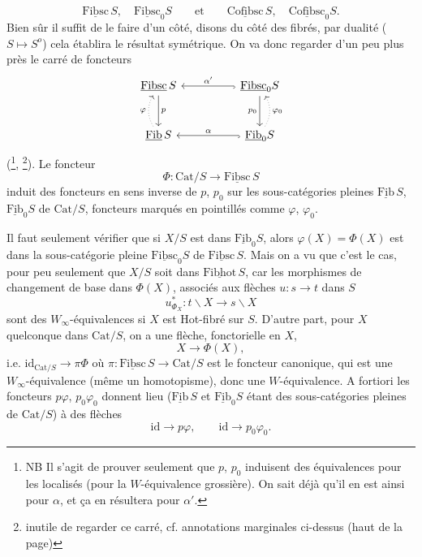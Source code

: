 \documentclass[11pt]{article}
\newcommand{\msp}[1]{\marginpar{\footnotesize [#1]}}
\newcommand{\uc}[1]{\underline{\mathrm{#1}}}
\newcommand{\Cat}{\mathrm{Cat}}
\begin{document}
\[
\uc{Fibsc}\,S,\quad \uc{Fibsc}_0S \qquad \text{et} \qquad \uc{Cofibsc}\,S,\quad \uc{Cofibsc}_0S.
\]
Bien sûr il suffit de le faire d'un côté, disons du côté des fibrés, par dualité ($S \longmapsto S^o$) cela établira le résultat symétrique. On va donc regarder d'un peu plus près le carré de foncteurs
\[
\begin{tikzcd}[column sep=huge, row sep=large]
\uc{Fibsc}\,S \arrow[d, "p"] & \uc{Fibsc}_0S \arrow[l, hook, "\alpha'"'] \arrow[d, "p_0"'] \\
\uc{Fib}\,S \arrow[u, dotted, bend left, "\varphi"] & \uc{Fib}_0S \arrow[l, hook, "\alpha"'] \arrow[u, dotted, bend right, "\varphi_0"']
\end{tikzcd}
\]
(\footnote[37]{NB Il s'agit de prouver seulement que $p$, $p_0$ induisent des équivalences pour les localisés (pour la $W$-équivalence grossière). On sait déjà qu'il en est ainsi pour $\alpha$, et ça en résultera pour $\alpha'$.}, \footnote[38]{inutile de regarder ce carré, cf. annotations marginales ci-dessus (haut de la page)}). Le foncteur
\[
\Phi : \Cat/S \longrightarrow \uc{Fibsc}\,S
\]
induit des foncteurs en sens inverse de $p$, $p_0$ sur les sous-catégories pleines $\uc{Fib}\,S$, $\uc{Fib}_0S$ de $\Cat/S$, foncteurs marqués en pointillés comme $\varphi$, $\varphi_0$.

\msp{page 54}

Il faut seulement vérifier que si $X/S$ est dans $\uc{Fib}_0S$, alors $\varphi(X) = \Phi(X)$ est dans la sous-catégorie pleine $\uc{Fibsc}_0S$ de $\uc{Fibsc}\,S$. Mais on a vu que c'est le cas, pour peu seulement que $X/S$ soit dans $\uc{Fibhot}\,S$, car les morphismes de changement de base dans $\Phi(X)$, associés aux flèches $u : s \longrightarrow t$ dans $S$
\[
u^*_{\Phi_X} : t\backslash X \longrightarrow s\backslash X
\]
sont des $W_\infty$-équivalences si $X$ est Hot-fibré sur $S$. D'autre part, pour $X$ quelconque dans $\Cat/S$, on a une flèche, fonctorielle en $X$,
\[
X \longrightarrow \Phi(X),
\]
i.e. $\mathrm{id}_{\Cat/S} \longrightarrow \pi\Phi$ où $\pi : \uc{Fibsc}\,S \longrightarrow \Cat/S$ est le foncteur canonique, qui est une $W_\infty$-équivalence (même un homotopisme), donc une $W$-équivalence. A fortiori les foncteurs $p\varphi$, $p_0\varphi_0$ donnent lieu ($\uc{Fib}\,S$ et $\uc{Fib}_0S$ étant des sous-catégories pleines de $\Cat/S$) à des flèches
\[
\mathrm{id} \longrightarrow p\varphi, \qquad \mathrm{id} \longrightarrow p_0\varphi_0.
\]
\end{document}
